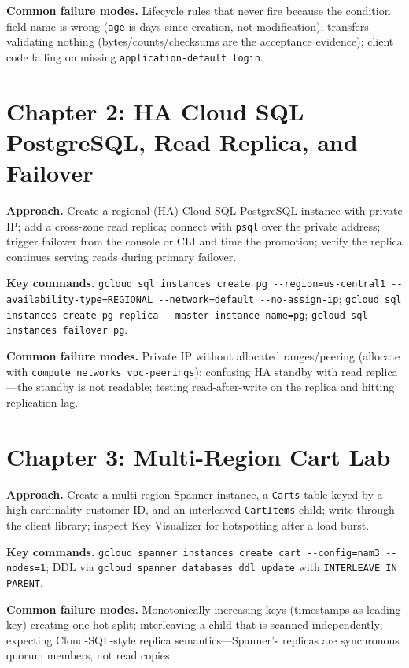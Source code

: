 \textbf{Common failure modes.} Lifecycle rules that never fire because the condition field name is
wrong (\texttt{age} is days since creation, not modification); transfers validating nothing
(bytes/counts/checksums are the acceptance evidence); client code failing on missing
\texttt{application-default login}.

\section{Chapter 2: HA Cloud SQL PostgreSQL, Read Replica, and Failover}
\textbf{Approach.} Create a regional (HA) Cloud SQL PostgreSQL instance with private IP; add a
cross-zone read replica; connect with \texttt{psql} over the private address; trigger failover from
the console or CLI and time the promotion; verify the replica continues serving reads during
primary failover.

\textbf{Key commands.} \texttt{gcloud sql instances create pg -{}-region=us-central1
-{}-availability-type=REGIONAL -{}-network=default -{}-no-assign-ip}; \texttt{gcloud sql instances
create pg-replica -{}-master-instance-name=pg}; \texttt{gcloud sql instances failover pg}.

\textbf{Common failure modes.} Private IP without allocated ranges/peering (allocate with
\texttt{compute networks vpc-peerings}); confusing HA standby with read replica---the standby is
not readable; testing read-after-write on the replica and hitting replication lag.

\section{Chapter 3: Multi-Region Cart Lab}
\textbf{Approach.} Create a multi-region Spanner instance, a \texttt{Carts} table keyed by a
high-cardinality customer ID, and an interleaved \texttt{CartItems} child; write through the
client library; inspect Key Visualizer for hotspotting after a load burst.

\textbf{Key commands.} \texttt{gcloud spanner instances create cart -{}-config=nam3
-{}-nodes=1}; DDL via \texttt{gcloud spanner databases ddl update} with \texttt{INTERLEAVE IN
PARENT}.

\textbf{Common failure modes.} Monotonically increasing keys (timestamps as leading key) creating
one hot split; interleaving a child that is scanned independently; expecting Cloud-SQL-style
replica semantics---Spanner's replicas are synchronous quorum members, not read copies.

